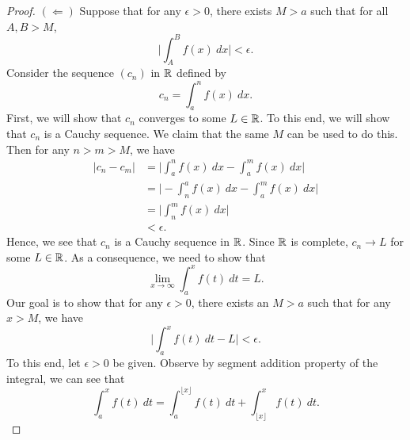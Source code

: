 \documentclass[a4paper]{article}
\begin{document}
\begin{proof}
\( (\Longleftarrow) \) Suppose that for any \( \epsilon > 0  \), there exists \( M > a  \) such that for all \( A,B > M  \), 
\[  \Big| \int_{ A }^{ B } f(x) \ dx  \Big| < \epsilon. \]
Consider the sequence \( ({c}_{n})   \) in \( \mathbb{R}  \) defined by
\[  {c}_{n} = \int_{ a }^{ n }  f(x) \ dx. \]
First, we will show that \( {c}_{n}  \) converges to some \( L \in \mathbb{R}  \). To this end, we will show that \( {c}_{n} \) is a Cauchy sequence. We claim that the same \( M  \) can be used to do this. 
Then for any \( n > m > M \), we have 
\begin{align*}
    | {c}_{n} - {c}_{m} | &= \Big| \int_{ a }^{ n }  f(x) \ dx  - \int_{ a }^{ m }  f(x) \ dx  \Big|  \\
                          &= \Big| - \int_{ n }^{ a }  f(x) \ dx - \int_{ a }^{ m }  f(x) \ dx   \Big|  \\
                          &= \Big| \int_{ n }^{ m }  f(x) \ dx  \Big|  \\
                          &< \epsilon.
\end{align*}
Hence, we see that \( {c}_{n} \) is a Cauchy sequence in \( \mathbb{R}  \). Since \( \mathbb{R}  \) is complete, \( {c}_{n} \to L  \) for some \( L \in \mathbb{R}  \). As a consequence, we need to show that 
\[  \lim_{ x \to  \infty   }  \int_{ a }^{ x  }  f(t) \ dt  =  L.   \]
Our goal is to show that for any \( \epsilon > 0  \), there exists an \( M > a  \) such that for any \( x > M  \), we have 
\[  \Big| \int_{ a }^{ x }  f(t) \ dt - L   \Big|  < \epsilon. \tag{*} \] 
To this end, let \( \epsilon > 0  \) be given. Observe by segment addition property of the integral, we can see that 
\[  \int_{ a }^{ x  }  f(t) \ dt = \int_{ a }^{  \lfloor x \rfloor } f(t) \ dt + \int_{ \lfloor x  \rfloor  }^{  x  }  f(t) \ dt.  \]


\end{proof}
\end{document}
